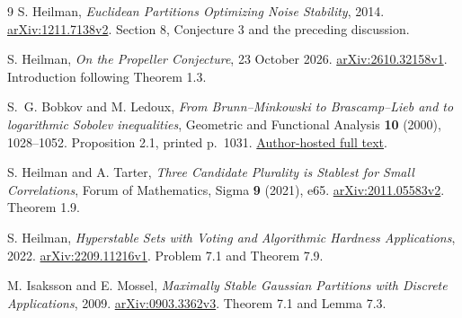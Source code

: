 \begin{thebibliography}{9}
S. Heilman,
\emph{Euclidean Partitions Optimizing Noise Stability},
2014.
\href{https://arxiv.org/abs/1211.7138v2}{arXiv:1211.7138v2}.
Section 8, Conjecture 3 and the preceding discussion.

S. Heilman,
\emph{On the Propeller Conjecture},
23 October 2026.
\href{https://arxiv.org/abs/2610.32158v1}{arXiv:2610.32158v1}.
Introduction following Theorem 1.3.

S.~G. Bobkov and M. Ledoux,
\emph{From Brunn--Minkowski to Brascamp--Lieb and to logarithmic Sobolev
inequalities}, Geometric and Functional Analysis \textbf{10} (2000),
1028--1052.
Proposition 2.1, printed p.~1031.
\href{https://www.math.univ-toulouse.fr/~ledoux/BrunnMinkowski.pdf}{Author-hosted full text}.

S. Heilman and A. Tarter,
\emph{Three Candidate Plurality is Stablest for Small Correlations},
Forum of Mathematics, Sigma \textbf{9} (2021), e65.
\href{https://arxiv.org/abs/2011.05583v2}{arXiv:2011.05583v2}.
Theorem 1.9.

S. Heilman,
\emph{Hyperstable Sets with Voting and Algorithmic Hardness Applications},
2022.
\href{https://arxiv.org/abs/2209.11216v1}{arXiv:2209.11216v1}.
Problem 7.1 and Theorem 7.9.

M. Isaksson and E. Mossel,
\emph{Maximally Stable Gaussian Partitions with Discrete Applications},
2009.
\href{https://arxiv.org/abs/0903.3362v3}{arXiv:0903.3362v3}.
Theorem 7.1 and Lemma 7.3.
\end{thebibliography}
